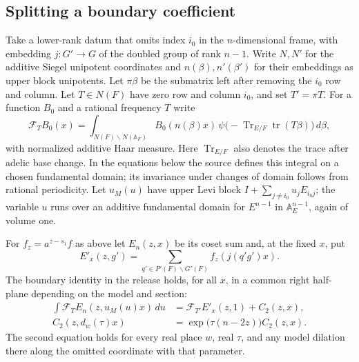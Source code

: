 \subsection{Splitting a boundary coefficient}

Take a lower-rank datum that omits index \(i_0\) in the \(n\)-dimensional
frame, with embedding \(j\colon G'\to G\) of the doubled group of
rank \(n-1\). Write \(N,N'\) for the additive Siegel unipotent
coordinates and \(n(\beta),n'(\beta')\) for their embeddings as
upper block unipotents. Let \(\pi\beta\) be the submatrix left
after removing the \(i_0\) row and column. Let \(T\in N(F)\) have
zero row and column \(i_0\), and set \(T'=\pi T\). For a function
\(B_0\) and a rational frequency \(T\) write
\[
 \mathcal F_T B_0(x)
 =\int_{N(F)\backslash N(\mathbb A_F)}
      B_0(n(\beta)x)\,
      \psi\bigl(-\operatorname{Tr}_{E/F}\operatorname{tr}(T\beta)\bigr)
      \,d\beta ,
\]
with normalized additive Haar measure. Here \(\operatorname{Tr}_{E/F}\)
also denotes the trace after adelic base change. In the equations
below the source defines this integral on a chosen fundamental
domain; its invariance under changes of domain follows from
rational periodicity. Let \(u_M(u)\) have upper Levi block
\(I+\sum_{j\ne i_0}u_j E_{i_0 j}\); the variable \(u\) runs
over an additive fundamental domain for \(E^{n-1}\) in
\(\mathbb A_E^{n-1}\), again of volume one.

For \(f_z=a^{z-s_1}f\) as above let \(E_n(z,x)\) be its coset
sum and, at the fixed \(x\), put
\[
 E'_{x}(z,g')=\sum_{q'\in P'(F)\backslash G'(F)}
                            f_z(j(q'g')x).
\]
The boundary identity in the release holds, for all \(x\), in a
common right half-plane depending on the model and section:
\begin{align}
 \int \mathcal F_T E_n(z,u_M(u)x)\,du
    &=\mathcal F_{T'} E'_{x}(z,1)+C_2(z,x),\label{eq:sw-cells}\\
 C_2(z,d_w(\tau)x)&=\exp\!\bigl(\tau(n-2z)\bigr)C_2(z,x).
 \label{eq:sw-dil}
\end{align}
The second equation holds for every real place \(w\), real
\(\tau\), and any model dilation there along the omitted
coordinate with that parameter.

